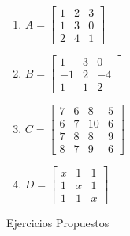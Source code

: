 \begin{enumerate}
\item
$A= \begin{bmatrix}
1 &  2 & 3 \\
1 &  3 & 0\\
2 &  4 & 1
\end{bmatrix}
$

\item
$B= \begin{bmatrix}
1 &  3 & 0 \\
-1 &  2 & -4\\
1 &  1 & 2
\end{bmatrix}
$

\item
$C= \begin{bmatrix}
7 &  6 & 8   &5\\
6 &  7 & 10  &  6\\
7 &  8 & 8  &  9\\
8 &  7 & 9  &6
\end{bmatrix}
$

\item
$D= \begin{bmatrix}
x &  1 & 1 \\
1 &  x & 1\\
1 &  1 & x
\end{bmatrix}
$

\end{enumerate}




{Ejercicios Propuestos}

